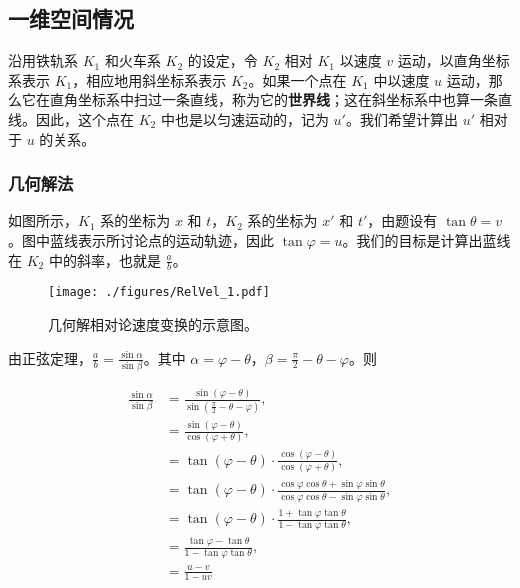 
\subsection{一维空间情况}

沿用铁轨系 $K_1$ 和火车系 $K_2$ 的设定，令 $K_2$ 相对 $K_1$ 以速度 $v$ 运动，以直角坐标系表示 $K_1$，相应地用斜坐标系表示 $K_2$。如果一个点在 $K_1$ 中以速度 $u$ 运动，那么它在直角坐标系中扫过一条直线，称为它的\textbf{世界线}；这在斜坐标系中也算一条直线。因此，这个点在 $K_2$ 中也是以匀速运动的，记为 $u'$。我们希望计算出 $u'$ 相对于 $u$ 的关系。


\subsubsection{几何解法}

如图所示，$K_1$ 系的坐标为 $x$ 和 $t$，$K_2$ 系的坐标为 $x'$ 和 $t'$，由题设有 $\tan{\theta}=v$。图中蓝线表示所讨论点的运动轨迹，因此 $\tan{\varphi}=u$。我们的目标是计算出蓝线在 $K_2$ 中的斜率，也就是 $\frac{a}{b}$。


\begin{figure}[ht]
\centering
\texttt{[image: ./figures/RelVel\_1.pdf]}
\caption{几何解相对论速度变换的示意图。} \label{RelVel_fig1}
\end{figure}

由正弦定理，$\frac{a}{b}=\frac{\sin{\alpha}}{\sin{\beta}}$。其中 $\alpha=\varphi-\theta$，$\beta=\frac{\pi}{2}-\theta-\varphi$。则

\begin{equation}\label{RelVel_eq1}
\begin{aligned}
\frac{\sin{\alpha}}{\sin{\beta}}&=\frac{\sin{(\varphi-\theta)}}{\sin{(\frac{\pi}{2}-\theta-\varphi)}},\\ 
&=\frac{\sin{(\varphi-\theta)}}{\cos{(\varphi+\theta)}},\\ 
&=\tan(\varphi-\theta)\cdot\frac{\cos(\varphi-\theta)}{\cos(\varphi+\theta)},\\ 
&=\tan(\varphi-\theta)\cdot\frac{\cos\varphi\cos\theta+\sin\varphi\sin\theta}{\cos\varphi\cos\theta-\sin\varphi\sin\theta},\\ 
&=\tan(\varphi-\theta)\cdot\frac{1+\tan\varphi\tan\theta}{1-\tan\varphi\tan\theta},\\ 
&=\frac{\tan\varphi-\tan\theta}{1-\tan\varphi\tan\theta},\\ 
&=\frac{u-v}{1-uv}
\end{aligned}
\end{equation}

